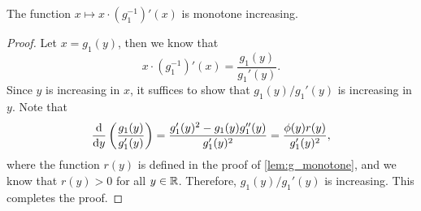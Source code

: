 \begin{lem}\label{lem:g_prime_monotone}
	The function $x \mapsto x \cdot (g_1^{-1})' (x)$ is monotone increasing.
\end{lem}
\begin{proof}
	Let $x = g_1 (y)$, then we know that
	\begin{equation*}
		x \cdot (g_1^{-1})' (x) = \frac{g_1 (y)}{g_1' (y)}.
	\end{equation*}
	Since $y$ is increasing in $x$, it suffices to show that $g_1 (y) / g_1' (y)$ is increasing in $y$. Note that
	\begin{equation*}
		\frac{\textup{d}}{\textup{d} y} \left( \frac{g_1 (y)}{g_1' (y)} \right) = \frac{g_1' (y)^2 - g_1 (y) g_1'' (y)}{g_1' (y)^2} = \frac{\phi(y) r(y)}{g_1' (y)^2},
	\end{equation*}
	where the function $r(y)$ is defined in the proof of \cref{lem:g_monotone}, and we know that $r (y) > 0$ for all $y \in \mathbb{R}$. Therefore, $g_1 (y) / g_1' (y)$ is increasing. This completes the proof. 
\end{proof}